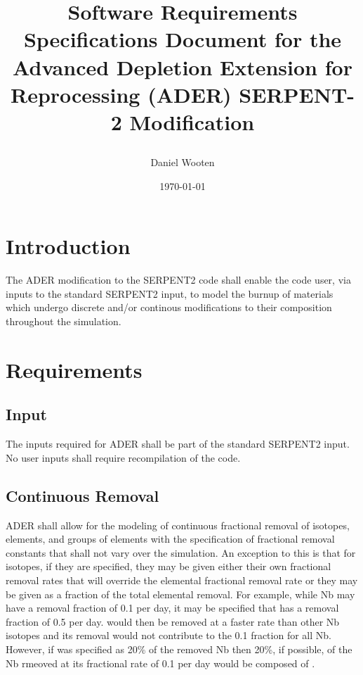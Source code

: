 \documentclass[12pt]{article}
\title{Software Requirements Specifications Document for the Advanced Depletion Extension for Reprocessing (ADER) SERPENT-2 Modification \\ {\small \date{\today}}}
\author{Daniel Wooten}
\begin{document}
\maketitle

\section{Introduction}
The ADER modification to the SERPENT2 code shall enable the code user, via
inputs to the standard SERPENT2 input, to model the burnup of materials which
undergo discrete and/or continous modifications to their composition throughout
the simulation.
\section{Requirements}
\subsection{Input}
The inputs required for ADER shall be part of the standard SERPENT2 input. No
user inputs shall require recompilation of the code.
\subsection{Continuous Removal}
ADER shall allow for the modeling of continuous fractional removal of isotopes,
elements, and groups of elements with the specification of
fractional removal constants that shall not vary over the simulation. An
exception to this is that for isotopes, if they are specified, they may be given
either their own fractional removal rates that will override the elemental
fractional removal rate or they may be given as a fraction of the total
elemental removal. 
For example, while
Nb may have a removal fraction of 0.1 per day, it may be specified that
 has a removal fraction of 0.5 per day. 
would then be removed at a faster rate than other Nb isotopes and its removal
would not contribute to the 0.1 fraction for all Nb. However, if 
 was specified as 20\% of the removed Nb then 20\%,
if possible, of the Nb rmeoved at its fractional rate of 0.1 per day would be
composed of .  
\end{document}
